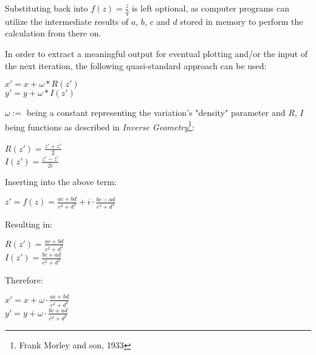 \documentclass[]{article}
\begin{document}
\noindent Substituting back into $f(z) = \frac{z}{q}$ is left optional, as computer programs can utilize the intermediate results of $a$, $b$, $c$ and $d$ stored in memory to perform the calculation from there on.

\noindent In order to extract a meaningful output for eventual plotting and/or the input of the next iteration, the following quasi-standard approach can be used:

\begin{flushleft}
	\hspace{20pt} $ x' = x + \omega * R(z') $\\
	\medskip
	\hspace{20pt} $ y' = y + \omega * I(z') $
\end{flushleft}

\noindent $\omega:=$ being a constant representing the variation's "density" parameter and $R$, $I$ being functions as described in \emph{Inverse Geometry}\footnote{Frank Morley and son, 1933}:

\begin{flushleft}
	\hspace{20pt} $ R(z') = \frac{z' + \overline{z'}}{2} $ \\
	\medskip
	\hspace{20pt} $ I(z') = \frac{z' - \overline{z'}}{2i} $
\end{flushleft}

\noindent Inserting into the above term:

\begin{flushleft}
	\hspace{20pt} $ z' = f(z) = \frac{ac + bd}{c^2 + d^2} + i \cdot \frac{bc - ad}{c^2 + d^2}
	 $
\end{flushleft}

\noindent Resulting in:

\begin{flushleft}
	\hspace{20pt} $ R(z') = \frac{ac + bd}{c^2 + d^2} $ \\
	\medskip
	\hspace{20pt} $ I(z') = \frac{bc + ad}{c^2 + d^2} $
\end{flushleft}

\noindent Therefore:

\begin{flushleft}
	\hspace{20pt} $ x' = x + \omega \cdot \frac{ac + bd}{c^2 + d^2} $ \\
	\medskip
	\hspace{20pt} $ y' = y + \omega \cdot \frac{bc + ad}{c^2 + d^2} $
\end{flushleft}
\end{document}
